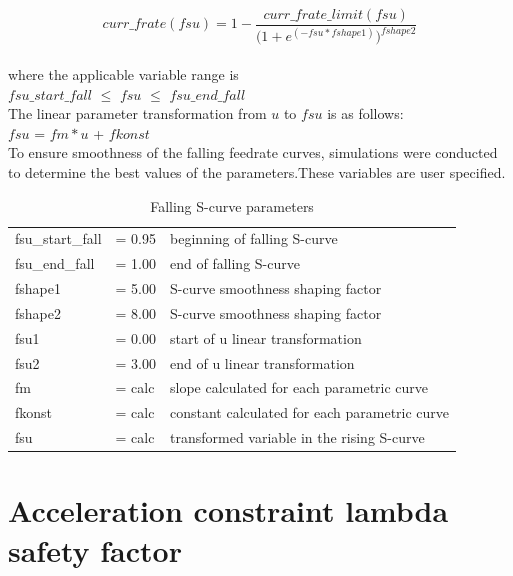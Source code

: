 \[ curr\_frate(fsu) = 1 - \frac{curr\_frate\_limit(fsu)} { \Bigg( 1 + e^{(-fsu*fshape1)} \Bigg) ^{fshape2} }  \] \\

\noindent
where the applicable variable range is \\
$fsu\_start\_fall$ $\le$ $fsu$ $\le$ $fsu\_end\_fall$\\

\noindent
The linear parameter transformation from $u$ to $fsu$ is as follows:\\
$fsu$ = $fm*u$ + $fkonst$ \\

To ensure smoothness of the falling feedrate curves, simulations were conducted to determine the best values of the parameters.These variables are user specified.\\


\begin{table}[!ht]
	\begin{center}
		\caption{Falling S-curve parameters}
		\label{Falling-S-curve-parameters}	
		\begin{tabular}{ p{3.0cm} p{2.0cm} p{8.0cm}}
			\hline	
			fsu\_start\_fall & = 0.95  & beginning of falling S-curve \nonumber \\
			fsu\_end\_fall   & = 1.00  & end of falling S-curve \nonumber \\
			fshape1          & = 5.00  & S-curve smoothness shaping factor \nonumber \\
			fshape2          & = 8.00  & S-curve smoothness shaping factor \nonumber \\
			fsu1             & = 0.00  & start of u linear transformation\nonumber \\
			fsu2             & = 3.00  & end of u linear transformation \nonumber \\
			fm               & = calc  & slope calculated for each parametric curve \nonumber \\
			fkonst			 & = calc  & constant calculated for each parametric curve \nonumber \\ 
			fsu              & = calc  & transformed variable in the rising S-curve \nonumber \\
			\hline
		\end{tabular}
	\end{center}
\end{table}

\clearpage
\pagebreak

\section{Acceleration constraint lambda safety factor}

